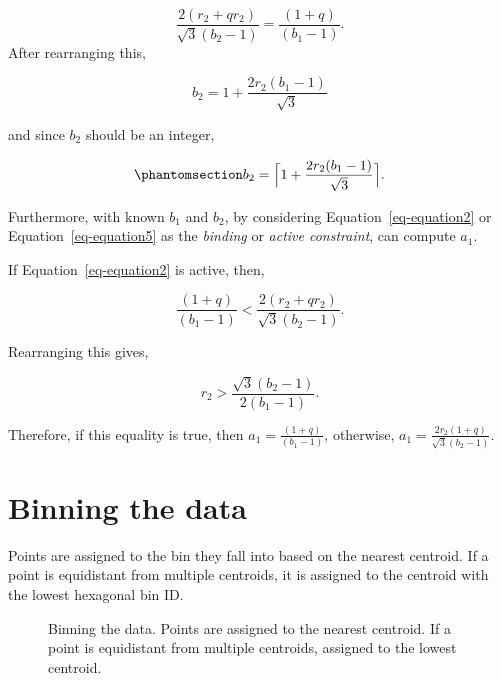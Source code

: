 \documentclass[
  12pt]{article}
\begin{document}
\[
\frac{2(r_2 + qr_2)}{\sqrt{3}(b_2 - 1)} = \frac{(1 + q)}{(b_1 - 1)}.
\] After rearranging this,

\[
b_2 = 1 + \frac{2r_2(b_1 - 1)}{\sqrt{3}}
\]

and since \(b_2\) should be an integer,

\begin{equation}\phantomsection\label{eq-equation8}{
b_2 = \Big\lceil1 +\frac{2r_2(b_1 - 1)}{\sqrt{3}}\Big\rceil.
}\end{equation}

Furthermore, with known \(b_1\) and \(b_2\), by considering
Equation~\ref{eq-equation2} or Equation~\ref{eq-equation5} as the
\emph{binding} or \emph{active constraint}, can compute \(a_1\).

If Equation~\ref{eq-equation2} is active, then,

\[
\frac{(1 + q)}{(b_1 - 1)} < \frac{2(r_2 + qr_2)}{\sqrt{3}(b_2 - 1)}.
\]

Rearranging this gives,

\[
r_2 > \frac{\sqrt{3}(b_2 - 1)}{2(b_1 - 1)}.
\]

Therefore, if this equality is true, then
\(a_1 = \frac{(1+q)}{(b_1 - 1)}\), otherwise,
\(a_1 = \frac{2r_2(1+q)}{\sqrt{3}(b_2 - 1)}\).

\newpage

\section{Binning the data}\label{binning-the-data}

Points are assigned to the bin they fall into based on the nearest
centroid. If a point is equidistant from multiple centroids, it is
assigned to the centroid with the lowest hexagonal bin ID.

\begin{figure}


\caption{\label{fig-assign-data}Binning the data. Points are assigned to
the nearest centroid. If a point is equidistant from multiple centroids,
assigned to the lowest centroid.}

\end{figure}%
\end{document}

